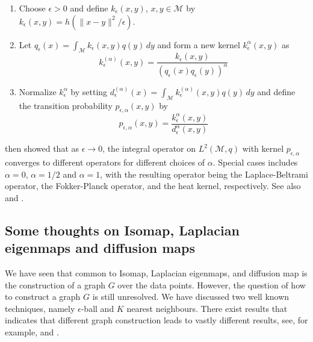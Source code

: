 \begin{enumerate}
\item Choose $\epsilon > 0$ and define $k_{\epsilon}(x,y)$, $x,y
  \in \mathcal{M}$ by $k_{\epsilon}(x,y) = h(\| x - y \|^2/\epsilon)$.
\item Let $q_{\epsilon}(x) = \int_{\mathcal{M}}{k_{\epsilon}(x,y) q(y)
    \,d y}$ and
  form a new kernel $k_{\epsilon}^{\alpha}(x,y)$ as
  \begin{equation}
    \label{eq:95}
    k_{\epsilon}^{(\alpha)}(x,y) =
    \frac{k_{\epsilon}(x,y)}{(q_{\epsilon}(x) q_{\epsilon}(y))^{\alpha}}
  \end{equation}
\item Normalize $k_{\epsilon}^{\alpha}$ by setting
  $d_{\epsilon}^{(\alpha)}(x) = \int_{\mathcal{M}}{k_{\epsilon}^{(\alpha)}(x,y) q(y)
    \, d y}$ and define the transition probability
    $p_{\epsilon,\alpha}(x,y)$ by
    \begin{equation}
      \label{eq:96}
      p_{\epsilon,\alpha}(x,y) = \frac{k_{\epsilon}^{\alpha}(x,y)}{d_{\epsilon}^{\alpha}(x,y)}
    \end{equation}
\end{enumerate}
\citet{coifman06:_diffus_maps} then showed that as $\epsilon
\rightarrow 0$, the integral operator on $L^{2}(\mathcal{M},q)$ with
kernel $p_{\epsilon,\alpha}$ converges to different operators for
different choices of $\alpha$. Special cases includes $\alpha = 0$,
$\alpha = 1/2$ and $\alpha = 1$, with the resulting operator being the
Laplace-Beltrami operator, the Fokker-Planck operator, and the heat
kernel, respectively. See also
\citet{nadler05:_diffus_eigen_fokker_planc_operat} and
\citet{nadler06:_diffus}.

\subsection{Some thoughts on Isomap, Laplacian eigenmaps and diffusion maps}
\label{sec:some-thoughts-isomap}
We have seen that common to Isomap, Laplacian eigenmaps, and diffusion
map is the construction of a graph $G$ over the data points.  However,
the question of how to construct a graph $G$ is still unresolved. We
have discussed two well known techniques, namely $\epsilon$-ball and
$K$ nearest neighbours. There exist results that indicates that
different graph construction leads to vastly different results, see,
for example, \citet{maier08:_influen} and \citet{maier09:_optim_k}.


